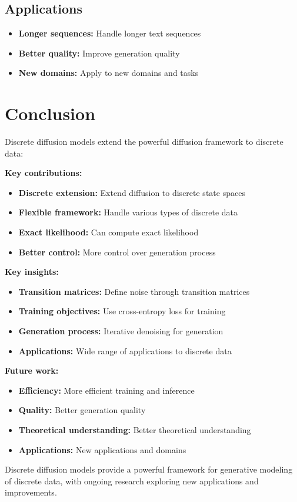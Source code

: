 \subsection{Applications}

\begin{itemize}
    \item \textbf{Longer sequences:} Handle longer text sequences
    \item \textbf{Better quality:} Improve generation quality
    \item \textbf{New domains:} Apply to new domains and tasks
\end{itemize}

\section{Conclusion}

Discrete diffusion models extend the powerful diffusion framework to discrete data:

\textbf{Key contributions:}
\begin{itemize}
    \item \textbf{Discrete extension:} Extend diffusion to discrete state spaces
    \item \textbf{Flexible framework:} Handle various types of discrete data
    \item \textbf{Exact likelihood:} Can compute exact likelihood
    \item \textbf{Better control:} More control over generation process
\end{itemize}

\textbf{Key insights:}
\begin{itemize}
    \item \textbf{Transition matrices:} Define noise through transition matrices
    \item \textbf{Training objectives:} Use cross-entropy loss for training
    \item \textbf{Generation process:} Iterative denoising for generation
    \item \textbf{Applications:} Wide range of applications to discrete data
\end{itemize}

\textbf{Future work:}
\begin{itemize}
    \item \textbf{Efficiency:} More efficient training and inference
    \item \textbf{Quality:} Better generation quality
    \item \textbf{Theoretical understanding:} Better theoretical understanding
    \item \textbf{Applications:} New applications and domains
\end{itemize}

Discrete diffusion models provide a powerful framework for generative modeling of discrete data, with ongoing research exploring new applications and improvements.
